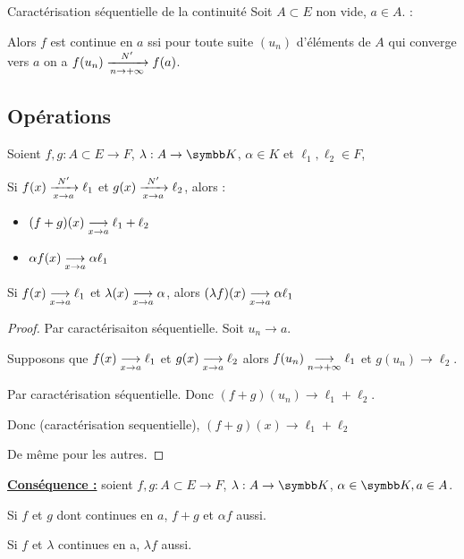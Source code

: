 \begin{theoreme}{Caractérisation séquentielle de la continuité}{}
    Soit $A \subset E$ non vide, $a \in A$. :

    Alors $f$ est continue en $a$ ssi pour toute suite $(u_n)$ d'éléments de $A$ 
    qui converge vers $a$ on a $f(u_n) \limitnorme{N'}{n}{+ \infty} f(a)$.
\end{theoreme}

\subsection{Opérations}

\begin{theoreme}{}{}
    Soient $f, g : A \subset E \to F$, $\lambda : A \to \K$, $\alpha \in K$ et $\ell_1, \ell_2 \in F$, 

    Si $f(x) \limitnorme{N'}{x}{a} \ell_1$ et $g(x) \limitnorme{N'}{x}{a} \ell_2$, alors :
    \begin{itemize}
        \item  $(f + g)(x) \limit x a \ell_1 + \ell_2$
        \item $\alpha f(x) \limit x a \alpha \ell_1$ 
    \end{itemize}

    Si $f(x) \limit x a \ell_1$ et $\lambda(x) \limit x a \alpha$, alors $(\lambda f)(x) \limit x a \alpha \ell_1$
\end{theoreme}


\begin{proof}
    Par caractérisaiton séquentielle. Soit $u_n \longrightarrow a$. 

    Supposons que $f(x) \limit x a \ell_1$ et $g(x) \limit x a \ell_2$ alors 
    $f(u_n) \limit n {+ \infty} \ell_1$ et $g(u_n) \longrightarrow \ell_2$. 

    Par caractérisation séquentielle. Donc $(f + g)(u_n) \longrightarrow \ell_1 + \ell_2$. 

    Donc (caractérisation sequentielle), $(f + g)(x) \longrightarrow \ell_1 + \ell_2$

    De même pour les autres. 
\end{proof}

\textbf{\uline{Conséquence :}} soient $f, g : A \subset E \to F$, $\lambda : A \to \K$, $\alpha \in \K, a \in A$. 

Si $f$ et $g$ dont continues en $a$, $f + g$ et $\alpha f$ aussi. 

Si $f$ et $\lambda$ continues en a, $\lambda f$ aussi. 

